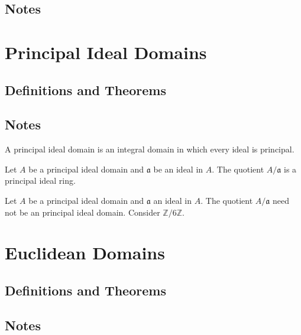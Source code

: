 \subsection*{Notes}

\newpage
\section{Principal Ideal Domains}
\subsection*{Definitions and Theorems}
\subsection*{Notes}

\begin{defbox}
    \begin{definition}
        A principal ideal domain is an integral domain in which every ideal is principal.
    \end{definition}
\end{defbox}

\begin{thmbox}
    \begin{lemma}
        Let \(A\) be a principal ideal domain and \(\mathfrak{a}\) be an ideal in \(A\). The quotient \(A/\mathfrak{a}\) is a principal ideal ring.
    \end{lemma}
\end{thmbox}

\begin{exmbox}
    \begin{example}
        Let \(A\) be a principal ideal domain and \(\mathfrak{a}\) an ideal in \(A\). The quotient \(A / \mathfrak{a}\) need not be an principal ideal domain. Consider \(\mathbb{Z}/6\mathbb{Z}\).
    \end{example}
\end{exmbox}

\newpage
\section{Euclidean Domains}
\subsection*{Definitions and Theorems}
\subsection*{Notes}